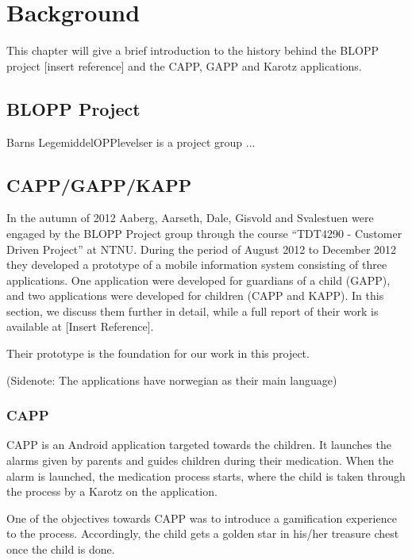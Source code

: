 \chapter{Background}
\label{chp:background}


This chapter will give a brief introduction to the history behind the BLOPP project [insert reference] and the CAPP, GAPP and Karotz applications.


\section{BLOPP Project}
\label{sec:bloppproject}
Barns LegemiddelOPPlevelser is a project group ...


\section{CAPP/GAPP/KAPP}
\label{sec:cappgappkapp}
In the autumn of 2012 Aaberg, Aarseth, Dale, Gisvold and Svalestuen were engaged by the BLOPP Project group through the course ``TDT4290 - Customer Driven Project'' \cite{customerdrivenntnu} at NTNU. During the period of August 2012 to December 2012 they developed a prototype of a mobile information system consisting of three applications. One application were developed for guardians of a child (GAPP), and two applications were developed for children (CAPP and KAPP). In this section, we discuss them further in detail, while a full report of their work is available at [Insert Reference].

Their prototype is the foundation for our work in this project.

(Sidenote: The applications have norwegian as their main language) %

\subsection{CAPP}
CAPP is an Android application targeted towards the children. It launches the alarms given by parents and guides children during their medication. When the alarm is launched, the medication process starts, where the child is taken through the process by a Karotz on the application. 


One of the objectives towards CAPP was to introduce a gamification experience to the process. Accordingly, the child gets a golden star in his/her treasure chest once the child is done.

